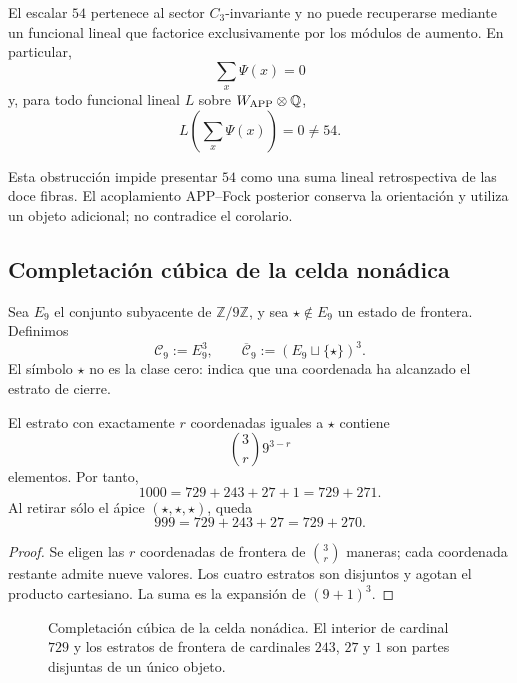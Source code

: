 \begin{corollary}
\label{p12-83-c1-s5:cor:obstruccion-isotipica-app-autonoma}
El escalar \(54\) pertenece al sector \(C_3\)-invariante y no puede
recuperarse mediante un funcional lineal que factorice exclusivamente por
los módulos de aumento. En particular,
\[
 \sum_x\Psi(x)=0
\]
y, para todo funcional lineal \(L\) sobre \(W_{\rm APP}\otimes\mathbb Q\),
\[
 L\!\left(\sum_x\Psi(x)\right)=0\neq54.
\]
\end{corollary}

Esta obstrucción impide presentar \(54\) como una suma lineal retrospectiva
de las doce fibras. El acoplamiento APP--Fock posterior conserva la
orientación y utiliza un objeto adicional; no contradice el corolario.

\subsection{Completación cúbica de la celda nonádica}

Sea \(E_9\) el conjunto subyacente de \(\mathbb Z/9\mathbb Z\), y sea
\(\star\notin E_9\) un estado de frontera. Definimos
\[
 \mathcal C_9:=E_9^3,
 \qquad
 \overline{\mathcal C}_9:=(E_9\sqcup\{\star\})^3.
\]
El símbolo \(\star\) no es la clase cero: indica que una coordenada ha
alcanzado el estrato de cierre.

\begin{theorem}
\label{p12-83-c1-s5:thm:emrh-binomial-autonoma}
El estrato con exactamente \(r\) coordenadas iguales a \(\star\) contiene
\[
 \binom3r9^{3-r}
\]
elementos. Por tanto,
\[
 \boxed{1000=729+243+27+1=729+271.}
\]
Al retirar sólo el ápice \((\star,\star,\star)\), queda
\[
 999=729+243+27=729+270.
\]
\end{theorem}

\begin{proof}
Se eligen las \(r\) coordenadas de frontera de \(\binom3r\) maneras; cada
coordenada restante admite nueve valores. Los cuatro estratos son disjuntos
y agotan el producto cartesiano. La suma es la expansión de
\((9+1)^3\).
\end{proof}

\begin{figure}[htbp]
\centering
\resizebox{0.96\linewidth}{!}{}
\caption{Completación cúbica de la celda nonádica. El interior de
cardinal \(729\) y los estratos de frontera de cardinales \(243\), \(27\) y
\(1\) son partes disjuntas de un único objeto.}
\label{p12-83-c1-s5:fig:cubo-emrh-autonomo}
\end{figure}

